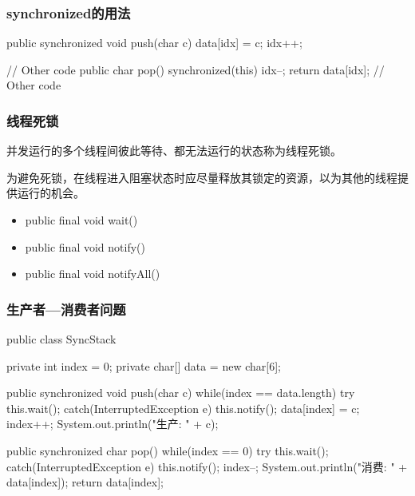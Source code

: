 \begin{frame}[fragile] %
  \frametitle{synchronized的用法}


  \begin{javaCode}
    public synchronized void push(char c) {
      data[idx] = c;
      idx++;
    }
  \end{javaCode}
  \begin{javaCode}
    // Other code
    public char pop() {
      synchronized(this) {
        idx--;
        return data[idx];
      }
      // Other code
    }
  \end{javaCode}
\end{frame}

\begin{frame}[fragile]
  \frametitle{线程死锁}

  并发运行的多个线程间彼此等待、都无法运行的状态称为线程死锁。

  为避免死锁，在线程进入阻塞状态时应尽量释放其锁定的资源，以为其他的线程提供运行的机会。

  
  \begin{itemize}
  \item public final void wait()
  \item public final void notify()
  \item public final void notifyAll()
  \end{itemize}

\end{frame}

\begin{frame}[fragile]
  \frametitle{生产者—消费者问题}

  \begin{javaCode}
    public class SyncStack {
      private int index = 0;
      private char[] data = new char[6];

      public synchronized void push(char c) {
        while(index == data.length) {
          try {
            this.wait();
          } catch(InterruptedException e) {
          }
        }
        this.notify();
        data[index] = c;
        index++;
        System.out.println("生产: " + c);
      }
      
      public synchronized char pop() {
        while(index == 0) {
          try {
            this.wait();
          } catch(InterruptedException e) {
          }
        }
        this.notify();
        index--;
        System.out.println("消费: " + data[index]);
        return data[index];
      }
    }
  \end{javaCode}
\end{frame}


